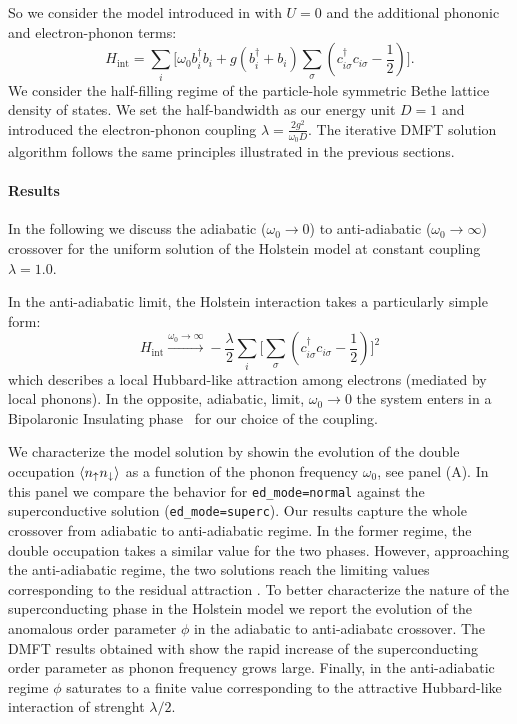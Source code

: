 \documentclass[edipack2.tex]{subfiles}
\begin{document}
So we consider the model introduced in 
with $U=0$ and the additional phononic and electron-phonon terms:
\begin{equation} \label{eqex:H_Holstein}
    H_\mathrm{int} = \sum_i \Big[\omega_0 b^\dagger_i b_i + g(b^\dagger_i +
    b_i)\sum_{\sigma}(c^\dagger_{i\sigma}c_{i\sigma}
    -\frac{1}{2})\Big]. 
\end{equation}
We consider the half-filling regime of the particle-hole symmetric
Bethe lattice density of states. We set the half-bandwidth as our
energy unit $D=1$ and introduced the electron-phonon coupling $\lambda
= \tfrac{2g^2}{\omega_0D}$.  
The iterative DMFT solution algorithm follows the same principles
illustrated in the previous sections. 

\paragraph{Results}
In the following we discuss the adiabatic ($\omega_0\to0$) to
anti-adiabatic ($\omega_0\to\infty$) crossover for
the uniform solution of the Holstein model at constant coupling $\lambda=1.0$.

In the anti-adiabatic limit, the Holstein interaction takes a
particularly simple form:
\begin{equation}\label{HlikeAttraction}
    H_\mathrm{int} \overset{ \omega_0 \rightarrow \infty}{ \longrightarrow } -\frac{\lambda}{2} \sum_i \Big[\sum_\sigma(c^\dagger_{i\sigma}c_{i\sigma} -\frac{1}{2}) \Big]^2
\end{equation}
which describes a local Hubbard-like attraction among electrons
(mediated by local phonons).
In the opposite, adiabatic, limit, $\omega_0 \rightarrow 0$ the system
enters in a Bipolaronic Insulating phase~\citep{Capone2006PRB} for our
choice of the coupling. 


We characterize the model solution by showin the evolution of the
double occupation $\langle n_{\uparrow}n_{\downarrow}\rangle$ as a function of the
phonon frequency $\omega_0$, see panel (A). In this panel we compare
the behavior for {\tt ed\_mode=normal} against the superconductive
solution ({\tt ed\_mode=superc}). Our results capture the whole
crossover from adiabatic to anti-adiabatic regime. In the former
regime, the double occupation takes a similar value for the two
phases. However, approaching the anti-adiabatic regime, the two
solutions reach the limiting values corresponding to the residual
attraction .   
To better characterize the nature of the superconducting
phase in the Holstein model we report the evolution of the anomalous order
parameter $\phi$ in the adiabatic to anti-adiabatc crossover.
The DMFT results obtained with \NAME show the rapid increase of the
superconducting order parameter as phonon frequency grows
large. Finally, in the anti-adiabatic regime $\phi$ saturates to a
finite value corresponding to the attractive Hubbard-like interaction
of strenght $\lambda/2$. 
\end{document}
